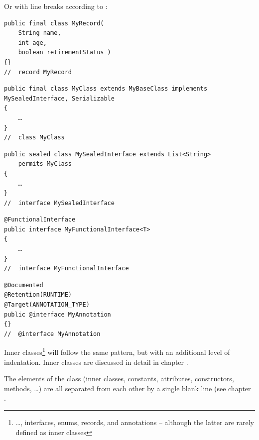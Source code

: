 Or with line breaks according to :
\begin{lstlisting}
public final class MyRecord( 
    String name, 
    int age, 
    boolean retirementStatus )
{}
//  record MyRecord
\end{lstlisting}

\begin{lstlisting}
public final class MyClass extends MyBaseClass implements MySealedInterface, Serializable
{
    …
}
//  class MyClass
\end{lstlisting}

\begin{lstlisting}
public sealed class MySealedInterface extends List<String>
    permits MyClass
{
    …
}
//  interface MySealedInterface
\end{lstlisting}

\begin{lstlisting}
@FunctionalInterface
public interface MyFunctionalInterface<T>
{
    …
}
//  interface MyFunctionalInterface
\end{lstlisting}

\begin{lstlisting}
@Documented
@Retention(RUNTIME)
@Target(ANNOTATION_TYPE)
public @interface MyAnnotation
{}
//  @interface MyAnnotation
\end{lstlisting}

Inner classes\footnote{…, interfaces, enums, records, and annotations – although the latter are rarely defined as inner classes} will follow the same pattern, but with an additional level of indentation. Inner classes are discussed in detail in chapter .

The elements of the class (inner classes, constants, attributes, constructors, methods, …) are all separated from each other by a single blank line (see chapter .

